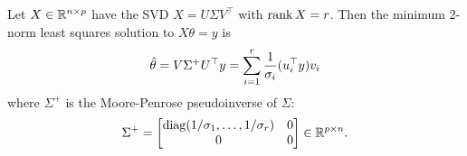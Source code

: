 \begin{theorem} \label{th:ls_svd}
Let $X \in \mathbb{R}^{n \times p}$ have the SVD $X = U\Sigma V^\top$ with $\operatorname{rank} X = r$.
Then the minimum 2-norm least squares solution to $X\theta = y$ is
\begin{equation}\label{eq:ols_svd_solution}
\hat{\theta} = V\Sigma^+U^\top y = \sum_{i=1}^r \frac{1}{\sigma_i}(u_i^\top y)v_i
\end{equation}
where $\Sigma^+$ is the Moore-Penrose pseudoinverse of $\Sigma$:
\begin{equation}\label{eq:pseudoinverse}
  \Sigma^+ = \begin{bmatrix}
    \operatorname{diag}(1/\sigma_1, \ldots, 1/\sigma_r) & 0 \\
    0 & 0
  \end{bmatrix} \in \mathbb{R}^{p \times n}.
\end{equation}
\end{theorem}

